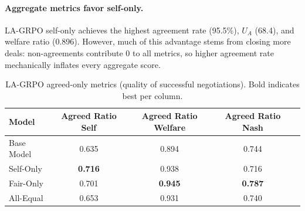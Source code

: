 \documentclass[12pt,a4paper]{article}
\renewcommand{\arraystretch}{1.25}
\begin{document}
\begin{table}[H]
\centering
\caption[LA-GRPO negotiation evaluation results.]{LA-GRPO negotiation evaluation results (20 repetitions, 560 games per model). Bold indicates best per column.}
\label{tab:lagrpo_eval_results}
\renewcommand{\arraystretch}{1.15}
\end{table}

\paragraph{Aggregate metrics favor self-only.} LA-GRPO self-only achieves the highest agreement rate (95.5\%), $U_A$ (68.4), and welfare ratio (0.896). However, much of this advantage stems from closing more deals: non-agreements contribute 0 to all metrics, so higher agreement rate mechanically inflates every aggregate score.

\begin{table}[H]
\centering
\caption[LA-GRPO agreed-only metrics (quality of successful negotiations).]{LA-GRPO agreed-only metrics (quality of successful negotiations). Bold indicates best per column.}
\label{tab:lagrpo_agreed}
\renewcommand{\arraystretch}{1.15}
\begin{tabular}{lcccc}
\toprule
\textbf{Model} & \textbf{Agreed Ratio Self} & \textbf{Agreed Ratio Welfare} & \textbf{Agreed Ratio Nash} \\
\midrule
Base Model & 0.635 & 0.894 & 0.744 \\
Self-Only & \textbf{0.716} & 0.938 & 0.716 \\
Fair-Only & 0.701 & \textbf{0.945} & \textbf{0.787} \\
All-Equal & 0.653 & 0.931 & 0.740 \\
\bottomrule
\end{tabular}
\end{table}
\end{document}
